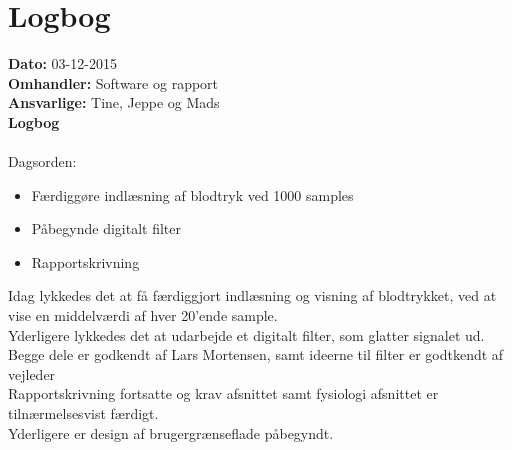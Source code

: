 \section{Logbog}

\textbf{Dato:} 03-12-2015\\
\textbf{Omhandler:} Software og rapport\\
\textbf{Ansvarlige:} Tine, Jeppe og Mads\\
\textbf{Logbog}
\\
\\
Dagsorden:
\begin{itemize}
	\item Færdiggøre indlæsning af blodtryk ved 1000 samples
	\item Påbegynde digitalt filter
	\item Rapportskrivning
\end{itemize}
Idag lykkedes det at få færdiggjort indlæsning og visning af blodtrykket, ved at vise en middelværdi af hver 20'ende sample.\\
Yderligere lykkedes det at udarbejde et digitalt filter, som glatter signalet ud. \\
Begge dele er godkendt af Lars Mortensen, samt ideerne til filter er godtkendt af vejleder \\[1ex]
Rapportskrivning fortsatte og krav afsnittet samt fysiologi afsnittet er tilnærmelsesvist færdigt.\\[1ex]
Yderligere er design af brugergrænseflade påbegyndt.